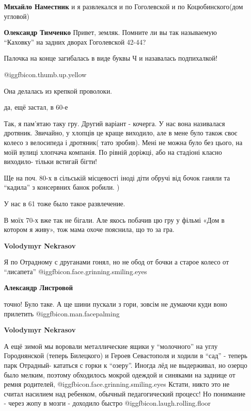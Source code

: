 \begin{itemize}
\begin{itemize} %
\textbf{Михайло Наместник} и я развлекался и по Гоголевской и по Коцюбинского(дом угловой)

\textbf{Олександр Тимченко} Привет, земляк. Помните ли вы так называемую \enquote{Каховку} на задних дворах Гоголевской 42-44?
\end{itemize} %

Палочка на конце загибалась в виде буквы Ч и назавалась подпихалкой!

 @igg{fbicon.thumb.up.yellow} 

Она делалась из крепкой проволоки.

да, ещё застал, в 60-е


Так, я пам'ятаю таку гру. Другий варіант - кочерга. У нас вона називалася
дротяник. Звичайно, у хлопців це краще виходило, але в мене було також своє
колесо з велосипеда і дротяник( тато зробив). Мені не можна було без цього, на
моїй вулиці хлопчача компанія. По рівній доріжці, або на стадіоні класно
виходило- тільки встигай бігти!


Ще на поч. 80-х в сільській місцевості іноді діти обручі від бочок ганяли та
\enquote{кадила} з консервних банок робили. )

У нас в 61 тоже было такое развлечение.


В моїх 70-х вже так не бігали. Але якось побачив цю гру у фільмі «Дом в котором
я живу», тож мама охоче пояснила, що то за гра.

\begin{itemize} %
\textbf{Volodymyr Nekrasov} 

Я по Отрадному с друганами гонял, но не обод от бочки а старое колесо от
\enquote{лисапета}  @igg{fbicon.face.grinning.smiling.eyes} 

\textbf{Александр Листровой} 

точно! Було таке. А ще шини пускали з гори, зовсім не думаючи куди воно
прилетить  @igg{fbicon.man.facepalming} 

\textbf{Volodymyr Nekrasov} 

А ещё зимой мы воровали металлические ящики у \enquote{молочного} на углу
Городнянской (теперь Билецкого) и Героев Севастополя и ходили в \enquote{сад} -
теперь парк Отрадный- кататься с горки к \enquote{озеру}. Иногда лёд не
выдерживал, но озерцо было мелким, поэтому обходилось мокрой одеждой и синяками
на заднице от ремня родителей, @igg{fbicon.face.grinning.smiling.eyes}  Кстати,
никто это не считал насилием над ребенком, обычный педагогический процесс! Но
понимание - через жопу в мозги - доходило быстро
@igg{fbicon.laugh.rolling.floor} 


\end{itemize}
\end{itemize}

